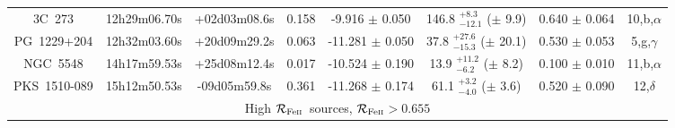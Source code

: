 \documentclass[a4paper,fleqn,usenatbib]{mnras}
\newcommand{\rfe}{${\cal R}_{\rm{Fe\textsc{ii}}}$}
\begin{document}
\begin{appendix}
\begin{longtable}{cccccccc}
3C~273 & 12h29m06.70s & +02d03m08.6s & 0.158 & -9.916 $\pm$ 0.050 & 146.8 $_{-12.1}^{+8.3}$ ($\pm$ 9.9) & 0.640 $\pm$ 0.064 & 10,b,$\alpha$ \\
PG~1229+204 & 12h32m03.60s & +20d09m29.2s & 0.063 & -11.281 $\pm$ 0.050 & 37.8 $_{-15.3}^{+27.6}$ ($\pm$ 20.1) & 0.530 $\pm$ 0.053 & 5,g,$\gamma$ \\
NGC~5548 & 14h17m59.53s & +25d08m12.4s & 0.017 & -10.524 $\pm$ 0.190 & 13.9 $_{-6.2}^{+11.2}$ ($\pm$ 8.2) & 0.100 $\pm$ 0.010 & 11,b,$\alpha$ \\
PKS~1510-089 & 15h12m50.53s & -09d05m59.8s & 0.361 & -11.268 $\pm$ 0.174 & 61.1 $_{-4.0}^{+3.2}$ ($\pm$ 3.6) & 0.520 $\pm$ 0.090 & 12,$\delta$ \\

\hline
\multicolumn{8}{c}{High \rfe\ sources, \rfe$>0.655$} \\
\hline


\end{longtable}
\end{appendix}
\end{document}
